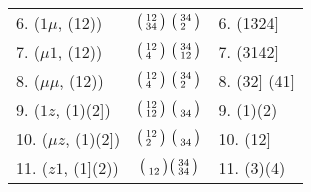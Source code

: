 \documentclass{surv-l}
\numberwithin{equation}{section}
\numberwithin{table}{section}
\numberwithin{figure}{section}
\theoremstyle{plain}
\theoremstyle{definition}
\begin{document}
\begin{table}[]
{\begin{tabular}{@{}|l|c|l|@{}}
6. ($1\mu$, (12))&$\big(\kern0.5pt\begin{smallmatrix}12 \\ 34\end{smallmatrix}\kern0.5pt\big)\ \big(\kern0.5pt\begin{smallmatrix}34 \\ 2\phantom{3}\end{smallmatrix}\kern0.5pt\big)$&6. (1324] \\[3pt]
7. ($\mu 1$, (12))&$\big(\kern0.5pt\begin{smallmatrix}12 \\ 4\phantom{3}\end{smallmatrix}\kern0.5pt\big)\ \big(\kern0.5pt\begin{smallmatrix}34 \\ 12\end{smallmatrix}\kern0.5pt\big)$&7. (3142] \\[3pt]
8. ($\mu\mu$, (12))&$\big(\kern0.5pt\begin{smallmatrix}12 \\ 4\phantom{3}\end{smallmatrix}\kern0.5pt\big)\ \big(\kern0.5pt\begin{smallmatrix}34 \\ 2\phantom{3}\end{smallmatrix}\kern0.5pt\big)$&8. (32] (41] \\[3pt]
9. ($1z$, (1)(2])&$\big(\kern0.5pt\begin{smallmatrix}12 \\ 12\end{smallmatrix}\kern0.5pt\big)\ \big(\kern0.5pt\begin{smallmatrix}\vphantom{34}\\ 34\end{smallmatrix}\kern0.5pt\big)$&9. (1)(2) \\[3pt]
10. ($\mu z$, (1)(2])&$\big(\kern0.5pt\begin{smallmatrix}12 \\ 2\phantom{3}\end{smallmatrix}\kern0.5pt\big)\ \big(\kern0.5pt\begin{smallmatrix}\vphantom{34}\\ 34\end{smallmatrix}\kern0.5pt\big)$&10. (12] \\[3pt]
11. ($z1$, (1](2))&$\big(\kern0.5pt\begin{smallmatrix}\vphantom{12}\\ 12\end{smallmatrix}\kern0.5pt\big) \big(\kern0.5pt\begin{smallmatrix}34 \\ 34\end{smallmatrix}\kern0.5pt\big)$&11. (3)(4) \\[3pt]

\end{tabular}}
\end{table}
\end{document}
